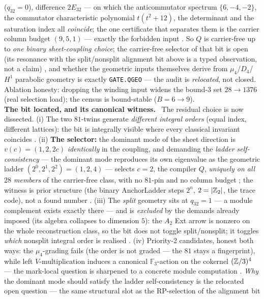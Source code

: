 \begin{winbox}
($q_{32}=0$), difference $2E_{32}$ --- on which the anticommutator spectrum $\{6,-4,-2\}$, the
commutator characteristic polynomial $t(t^2{+}12)$, the determinant and the saturation index all
\emph{coincide}; the one certificate that separates them is the carrier column budget $(9,5,1)$ ---
exactly the forbidden input \mE.  So $Q$ is carrier-free up to \emph{one binary sheet-coupling
choice}; the carrier-free selector of that bit is open (its resonance with the split/nonsplit
alignment bit above is a typed observation, not a claim) \mO, and whether the geometric inputs
themselves derive from $\mu_4$/$D_4$/$H^1$ parabolic geometry is exactly \texttt{GATE.QGEO} ---
the audit is \emph{relocated}, not closed.  Ablation honesty: dropping the winding input widens
the bound-$3$ set $28\to1376$ (real selection load); the census is bound-stable ($B=6\to9$).
\smallskip\\
\noindent\textbf{The bit located, and its canonical witness.}
\ The residual choice is now dissected.  (i) The two
$81$-twins generate \emph{different integral orders} (equal index, different lattices): the bit
is integrally visible where every classical invariant coincides \mE.  (ii) \textbf{The
selector:} the dominant mode of the sheet direction is $v(c)=(1,2,2c)$ \emph{identically} in the
coupling, and demanding the \emph{ladder self-consistency} --- the dominant mode reproduces its
own eigenvalue as the geometric ladder $(2^0,2^1,2^2)=(1,2,4)$ --- selects $c=2$, the compiler
$Q$, \emph{uniquely on all $28$ members} of the carrier-free class, with no $81$-pin and no
column budget \mE; the witness is prior structure (the binary AnchorLadder steps $2^n$,
$2=|\mathbb{Z}_2|$, the trace code), not a found number \mC.  (iii) The \emph{split} geometry sits at
$q_{32}=1$ --- a module complement exists exactly there --- and is \emph{excluded} by the
demands already imposed (its algebra collapses to dimension $5$): the $A_2$ Ext arrow is
nonzero on the whole reconstruction class, so the bit does not toggle split/nonsplit; it
toggles \emph{which} nonsplit integral order is realised \mE.  (iv) Priority-2 candidates,
honest both ways: the $\mu_4$-grading fails (the order is not graded --- the $81$ stays a
fingerprint), while left $V$-multiplication induces a canonical $\mathbb F_3$-action on the
cokernel $(\mathbb{Z}/3)^4$ --- the mark-local question is sharpened to a concrete module computation
\mO.  \emph{Why} the dominant mode should satisfy the ladder self-consistency is the relocated
open question --- the same structural slot as the RP-selection of the alignment bit

\end{winbox}
